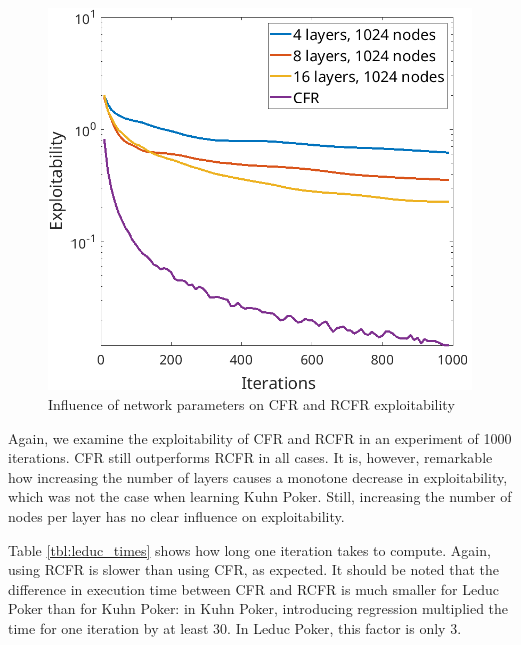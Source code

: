 \documentclass[10pt,a4paper]{article}
\begin{document}
\begin{figure}[h]
\includegraphics[scale=0.26]{Figures/rcfr_leduc_parameters3.png}
\caption{Influence of network parameters on CFR and RCFR exploitability}
\label{fig:rcfr_kuhn}
\end{figure}

Again, we examine the exploitability of CFR and RCFR in an experiment of 1000 iterations. CFR still outperforms RCFR in all cases. It is, however, remarkable how increasing the number of layers causes a monotone decrease in exploitability, which was not the case when learning Kuhn Poker. Still, increasing the number of nodes per layer has no clear influence on exploitability.

Table \ref{tbl:leduc_times} shows how long one iteration takes to compute. Again, using RCFR is slower than using CFR, as expected. It should be noted that the difference in execution time between CFR and RCFR is much smaller for Leduc Poker than for Kuhn Poker: in Kuhn Poker, introducing regression multiplied the time for one iteration by at least 30. In Leduc Poker, this factor is only 3.
\end{document}
